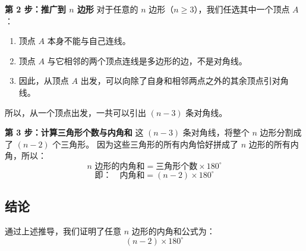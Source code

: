 \documentclass[DIN, pagenumber=false, fontsize=11pt, parskip=half]{scrartcl}
\begin{document}
\textbf{第 2 步：推广到 $n$ 边形}
对于任意的 $n$ 边形（$n \ge 3$），我们任选其中一个顶点 $A$：
\begin{enumerate}
    \item 顶点 $A$ 本身不能与自己连线。
    \item 顶点 $A$ 与它相邻的两个顶点连线是多边形的边，不是对角线。
    \item 因此，从顶点 $A$ 出发，可以向除了自身和相邻两点之外的其余顶点引对角线。
\end{enumerate}

所以，从一个顶点出发，一共可以引出 \textbf{$(n-3)$} 条对角线。

\textbf{第 3 步：计算三角形个数与内角和}
这 $(n-3)$ 条对角线，将整个 $n$ 边形分割成了 \textbf{$(n-2)$} 个三角形。
因为这些三角形的所有内角恰好拼成了 $n$ 边形的所有内角，所以：
\[
n \text{ 边形的内角和} = \text{三角形个数} \times 180^\circ
\]
\[
\text{即：} \quad \text{内角和} = (n-2) \times 180^\circ
\]

\subsection*{结论}
通过上述推导，我们证明了任意 $n$ 边形的内角和公式为：
\[
\boxed{(n-2) \times 180^\circ}
\]
\end{document}
